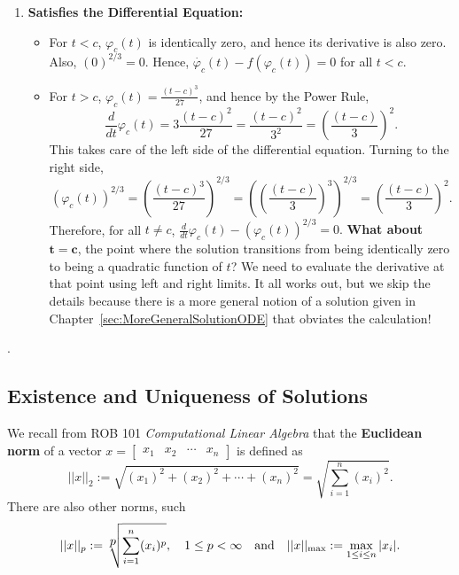 \begin{enumerate}
    \item \textbf{Satisfies the Differential Equation:} 
    \begin{itemize}
    \setlength{\itemsep}{.2cm}
        \item For $t < c$, $\varphi_c(t)$ is identically zero, and hence its derivative is also zero. Also, $(0)^{2/3}=0$. Hence, $\dot{\varphi_c}(t) - f(\varphi_c(t)) = 0$ for all $t<c$.
         \item For $t > c$, $\varphi_c(t) = \frac{(t-c)^3}{27}$, and hence by the Power Rule, 
         $$\frac{d}{dt} \varphi_c(t) = 3\frac{(t-c)^2}{27} = \frac{(t-c)^2}{3^2}= \left(\frac{(t-c)}{3} \right)^2.$$ 
         This takes care of the left side of the differential equation. Turning to the right side, 
         $$ \left(\varphi_c(t) \right)^{2/3} =  \left(\frac{(t-c)^3}{27} \right)^{2/3} = \left( \left(\frac{(t-c)}{3} \right)^3 \right)^{2/3} = \left(\frac{(t-c)}{3} \right)^2.$$
         Therefore, for all $t\neq c$, $\frac{d}{dt} \varphi_c(t)-\left(\varphi_c(t) \right)^{2/3} =0.$ \textbf{What about $\bm{t=c}$}, the point where the solution transitions from being identically zero to being a quadratic function of $t$? We need to evaluate the derivative at that point using left and right limits. It all works out, but we skip the details because there is a more general notion of a solution given in Chapter~\ref{sec:MoreGeneralSolutionODE} that obviates the calculation!
    \end{itemize}
    \end{enumerate}

\Qed. 



\bigskip

\subsection{Existence and Uniqueness of Solutions}
\label{sec:ExistenceUniquenessSolutionsODEs}

We recall from ROB 101 \textit{Computational Linear Algebra} that the \textbf{Euclidean norm} of a vector $x=\begin{bmatrix} x_1 & x_2  &  \cdots &  x_n  \end{bmatrix} $ is defined as
\begin{equation}
    \label{eq:DefEuclideanNorm}
    ||x||_2:=\sqrt{(x_1)^2 + (x_2)^2 + \cdots + (x_n)^2} = \sqrt{\sum_{i=1}^n (x_i)^2}.
\end{equation}
There are also other norms, such 
$$||x||_p:= \sqrt[\scalebox{1.0}{$p$}]{\sum_{i=1}^n (x_i)^p}, \quad 1 \le p < \infty \quad \text{and} \quad ||x||_{\rm max}:= \max_{1\le i \le n} |x_i|.$$

